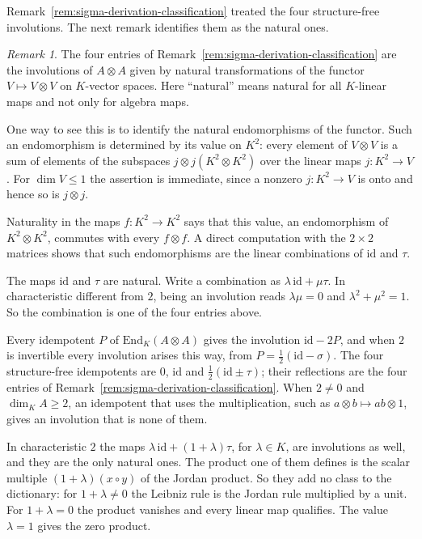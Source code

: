 \documentclass[]{interact}
\theoremstyle{plain}
\theoremstyle{definition}
\theoremstyle{remark}
\newtheorem{remark}[theorem]{Remark}
\begin{document}
Remark~\ref{rem:sigma-derivation-classification} treated the four structure-free involutions. The next remark identifies them as the natural ones. %

\begin{remark}\label{rem:natural-involutions}
The four entries of Remark~\ref{rem:sigma-derivation-classification} are the involutions of $A \otimes A$ given by natural transformations of the functor $V \mapsto V \otimes V$ on $K$-vector spaces. Here ``natural'' means natural for all $K$-linear maps and not only for algebra maps.

One way to see this is to identify the natural endomorphisms of the functor. %
Such an endomorphism is determined by its value on $K^2$: every element of $V \otimes V$ is a sum of elements of the subspaces $j \otimes j(K^2 \otimes K^2)$ over the linear maps $j \colon K^2 \to V$. For $\dim V \le 1$ the assertion is immediate, since a nonzero $j \colon K^2 \to V$ is onto and hence so is $j \otimes j$.

Naturality in the maps $f \colon K^2 \to K^2$ says that this value, an endomorphism of $K^2 \otimes K^2$, commutes with every $f \otimes f$. %
A direct computation with the $2 \times 2$ matrices shows that such endomorphisms are the linear combinations of $\mathrm{id}$ and $\tau$.

The maps $\mathrm{id}$ and $\tau$ are natural. %
Write a combination as $\lambda\,\mathrm{id} + \mu\tau$.
In characteristic different from $2$, being an involution reads $\lambda\mu = 0$ and $\lambda^2 + \mu^2 = 1$.
So the combination is one of the four entries above.

Every idempotent $P$ of $\mathrm{End}_K(A \otimes A)$ gives the involution $\mathrm{id} - 2P$, and when $2$ is invertible every involution arises this way, from $P = \tfrac12(\mathrm{id} - \sigma)$. The four structure-free idempotents are $0$, $\mathrm{id}$ and $\tfrac12(\mathrm{id} \pm \tau)$; their reflections are the four entries of Remark~\ref{rem:sigma-derivation-classification}. When $2 \ne 0$ and $\dim_K A \ge 2$, an idempotent that uses the multiplication, such as $a \otimes b \mapsto ab \otimes 1$, gives an involution that is none of them.

In characteristic $2$ the maps $\lambda\,\mathrm{id} + (1+\lambda)\tau$, for $\lambda \in K$, are involutions as well, and they are the only natural ones. The product one of them defines is the scalar multiple $(1+\lambda)(x \circ y)$ of the Jordan product. So they add no class to the dictionary: for $1+\lambda \ne 0$ the Leibniz rule is the Jordan rule multiplied by a unit. For $1+\lambda = 0$ the product vanishes and every linear map qualifies. The value $\lambda = 1$ gives the zero product. %


\end{remark}
\end{document}
